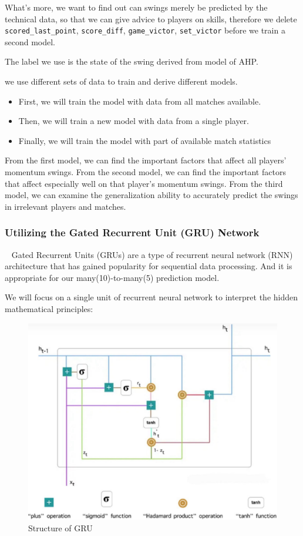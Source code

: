 What's more, we want to find out can swings merely be predicted by the technical data,
so that we can give advice to players on skills,
therefore we delete \verb|scored_last_point|, \verb|score_diff|, \verb|game_victor|, \verb|set_victor| before we train a second model.

The label we use is the state of the swing derived from model of AHP.

we use different sets of data to train and derive different models.

\begin{itemize}
    \item First, we will train the model with data from all matches available.
    \item Then, we will train a new model with data from a single player.
    \item Finally, we will train the model with part of available match statistics
\end{itemize}

From the first model, we can find the important factors that affect all players' momentum swings.
From the second model, we can find the important factors that affect 
especially well on that player's momentum swings.
From the third model, we can examine
the generalization ability to accurately predict the swings in irrelevant players and matches.

\subsubsection{Utilizing the Gated Recurrent Unit (GRU) Network}~{}
Gated Recurrent Units (GRUs) are a type of recurrent neural network (RNN) 
architecture that has gained popularity for sequential data processing. 
And it is appropriate for our many(10)-to-many(5) prediction model.

We will focus on a single unit of recurrent neural network to interpret the hidden mathematical principles:
\begin{figure}[H]
    \centering
    \includegraphics[scale=0.15]{mainmatter/imgs/6.jpg}
    \caption{Structure of GRU}
\end{figure}

